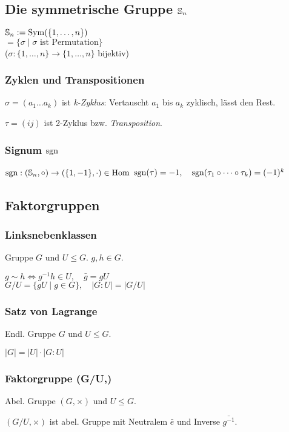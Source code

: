 \subsection*{Die symmetrische Gruppe $\S_n$}
$\S_n := \Sym(\{1,\dots,n\})$\\
$=\{\sigma \mid \sigma \text{ ist Permutation}\}$\\
($\sigma : \{1,\dots,n\}\to\{1,\dots,n\}$ bijektiv)

\subsubsection*{Zyklen und Transpositionen}
$\sigma = (a_1 \dots a_k)$ ist \textit{k-Zyklus}:
Vertauscht $a_1$ bis $a_k$ zyklisch, lässt den Rest.

$\tau  = (i j)$ ist 2-Zyklus bzw. \textit{Transposition}.

\subsubsection*{Signum $\sgn$}
$\sgn : (\S_n, \circ) \to (\{1,-1\},\cdot) \in \Hom$
$\sgn(\tau)=-1, \quad \sgn(\tau_1 \circ \dots \circ \tau_k)=(-1)^k$

\subsection*{Faktorgruppen}

\subsubsection*{Linksnebenklassen}
Gruppe $G$ und $U\le G$. $g,h\in G$.

$ g \sim h \iff g^{-1}h\in U,\quad \bar g = gU$\\
$ G/U = \{gU \mid g \in G \}, \quad |G:U| = |G/U| $

\subsubsection*{Satz von Lagrange}
Endl. Gruppe $G$ und $U \le G$.

$|G| = |U|\cdot|G:U|$

\subsubsection*{Faktorgruppe (G/U,\times)}
Abel. Gruppe $(G,\times)$ und $U \le G$.

$(G/U,\times)$ ist abel. Gruppe mit
Neutralem $\bar e$ und Inverse $\bar{g^{-1}}$.

